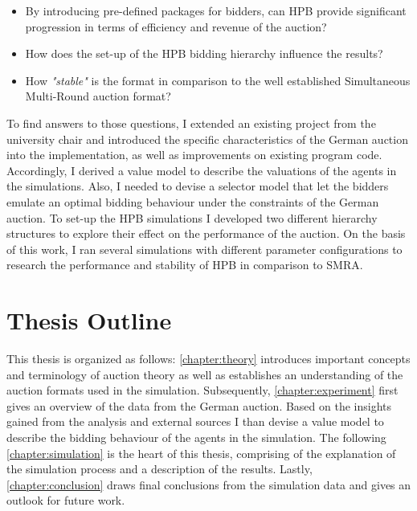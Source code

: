 \begin{itemize}
	\item By introducing pre-defined packages for bidders, can HPB provide significant progression in terms of efficiency and revenue of the auction?
	\item How does the set-up of the HPB bidding hierarchy influence the results?
	\item How \textit{"stable"} is the format in comparison to the well established Simultaneous Multi-Round auction format? 
\end{itemize}

To find answers to those questions, I extended an existing project from the university chair and introduced the specific characteristics of the German auction into the implementation, as well as improvements on existing program code. Accordingly, I derived a value model to describe the valuations of the agents in the simulations. Also, I needed to devise a selector model that let the bidders emulate an optimal bidding behaviour under the constraints of the German auction. To set-up the HPB simulations I developed two different hierarchy structures to explore their effect on the performance of the auction. 
On the basis of this work, I ran several simulations with different parameter configurations to research the performance and stability of HPB in comparison to SMRA.

\section{Thesis Outline}
This thesis is organized as follows: \autoref{chapter:theory} introduces important concepts and terminology of auction theory as well as establishes an understanding of the auction formats used in the simulation. Subsequently, \autoref{chapter:experiment} first gives an overview of the data from the German auction. Based on the insights gained from the analysis and external sources I  than devise a value model to describe the bidding behaviour of the agents in the simulation. The following \autoref{chapter:simulation} is the heart of this thesis, comprising of the explanation of the simulation process and a description of the results. Lastly, \autoref{chapter:conclusion} draws final conclusions from the simulation data and gives an outlook for future work.


